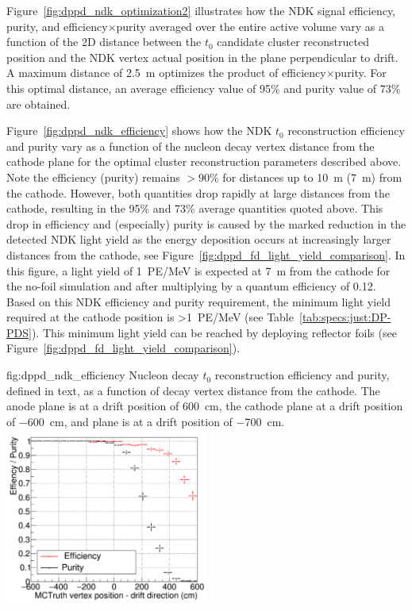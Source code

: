 Figure~\ref{fig:dppd_ndk_optimization2} illustrates how the NDK signal efficiency, purity, and efficiency$\times$purity averaged over the entire  active volume vary as a function of the 2D distance between the $t_0$ candidate cluster reconstructed position and the NDK vertex actual position in the plane perpendicular to drift. A maximum distance of \SI{2.5}{\m} optimizes the product of efficiency$\times$purity. For this optimal distance, an average efficiency value of \num{95}\% and purity value of \num{73}\% are obtained.  

Figure~\ref{fig:dppd_ndk_efficiency} shows how the NDK $t_0$ reconstruction efficiency and purity vary as a function of the nucleon decay vertex distance from the cathode plane for the optimal cluster reconstruction parameters described above. Note the efficiency (purity) remains $>90\%$ for distances up to \SI{10}{\m} (\SI{7}{\m}) from the cathode. However, both quantities drop rapidly at large distances from the cathode, resulting in the 95\% and 73\% average quantities quoted above. This drop in efficiency and (especially) purity is caused by the marked reduction in the detected NDK light yield as the energy deposition occurs at increasingly larger distances from the cathode, see Figure~\ref{fig:dppd_fd_light_yield_comparison}. In this figure, a light yield of \SI{1}{PE/\MeV} is expected at \SI{7}{\m} from the cathode for the no-foil simulation and after multiplying by a quantum efficiency of \num{0.12}. Based on this NDK efficiency and purity requirement, the minimum light yield required at the cathode position is \SI{>1}{PE/\MeV} (see Table~\ref{tab:specs:just:DP-PDS}). This minimum light yield can be reached by deploying  reflector foils (see Figure~\ref{fig:dppd_fd_light_yield_comparison}).

\begin{dunefigure}{fig:dppd_ndk_efficiency}
     {Nucleon decay $t_0$ reconstruction efficiency and purity, defined in text, as a function of decay vertex distance from the cathode. The anode plane is at a drift position of \SI{+600}{\cm}, the cathode plane at a drift position of \SI{-600}{\cm},  and  plane is at a drift position of \SI{-700}{\cm}.}
    \includegraphics[width=0.5\textwidth]{graphics/dppd_ndk_efficiency.pdf}
    \end{dunefigure}

